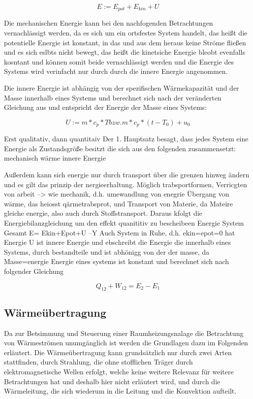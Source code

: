 \begin{equation}
\label{eq:energie}
E := E_{pot} + E_{kin} + U
\end{equation}
 
Die mechanischen Energie kann bei den nachfogenden Betrachtungen vernachlässigt werden, da es sich um ein ortsfestes System handelt, das heißt die potentielle Energie ist konstant, in das und aus dem heraus keine Ströme fließen und es sich eslbts nicht bewegt, das heißt die kinetsiche Energie bleobt evenfalls kosntant und können somit beide vernachlässigt werden und die Energie des Systems wird verinfacht nur durch durch die innere Energie angenommen.



Die innere Energie ist abhängig von der spezifischen Wärmekapazität und der Masse innerhalb eines Systems und berechnet sich nach der veränderten Gleichung aus \cite[S.~54]{ba12} und entspricht der Energie der Masse eines Systems:

\begin{equation}
\label{eq:innereenergie}
U := m*c_p*T bzw. m*c_p*(t-T_0)+u_0
\end{equation}

Erst qualitativ, dann quantitaiv
Der 1. Hauptsatz besagt, dass jedes System eine Energie als Zustandsgröße besitzt die sich aus den folgenden zusammensetzt:
mechanisch
wärme
innere Energie

\cite[S.~48]{ba12}
Außerdem kann sich energie nur durch transport über die grenzen hinweg ändern und es gilt das prinzip der nergieerhaltung. Möglich trabsportformen, Verricgten von arbeit --> wie mechanik, d.h. umewandlung von enegrie
Übergang von wärme, das heiosst qärmetrabsprot, und Transport von Materie, da Mateire gleiche energie, also auch durch Stoffstransport.
Daraus kfolgt die Energiebilanzgleichung um den effekt quanititiv zu bescheibeen
Energie System Gesamt E= Ekin+Epot+U --Y Auch System in Ruhe, d.h. ekin=epot=0 hat Energie
U ist innere Energie und ebschreibt die Energie die innerhalb eines Systems, durch bestandteile und ist abhönigg von der der masse, da Masse=energie
Energie eines systems ist konstant und berechnet sich nach folgender Gleichung \cite[S.~54]{ba12}

\begin{equation}
\label{eq:hauptsatz}
Q_{12} + W_{12} = E_2 - E_1
\end{equation}


\subsection{Wärmeübertragung}
Da zur Betsimmung und Steuerung einer Raumheizungsnalage die Betrachtung von Wärmeströmen unumgänglich ist werden die Grundlagen dazu im Folgenden erläutert.
Die Wärmeübertragung kann grundsätzlich nur durch zwei Arten stattfinden, durch Strahlung, die ohne stofflichen Träger durch elektromagnetische Wellen erfolgt, welche keine weitere Relevanz für weitere Betrachtungen hat und deshalb hier nicht erläutert wird, und durch die Wärmeleitung, die sich wiederum in die Leitung und die Konvektion aufteilt. \cite[S.~3f.]{bo14}

